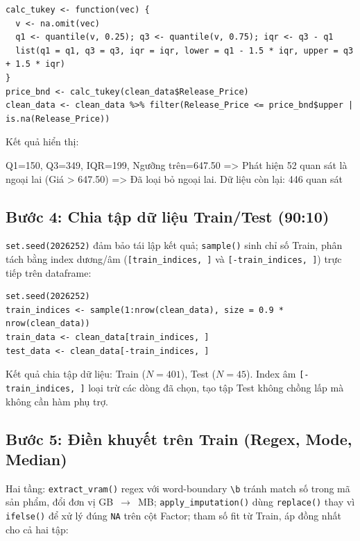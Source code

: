 \begin{verbatim}
calc_tukey <- function(vec) {
  v <- na.omit(vec)
  q1 <- quantile(v, 0.25); q3 <- quantile(v, 0.75); iqr <- q3 - q1
  list(q1 = q1, q3 = q3, iqr = iqr, lower = q1 - 1.5 * iqr, upper = q3 + 1.5 * iqr)
}
price_bnd <- calc_tukey(clean_data$Release_Price)
clean_data <- clean_data %>% filter(Release_Price <= price_bnd$upper | is.na(Release_Price))
\end{verbatim}
Kết quả hiển thị:
\begin{rconsole}
Q1=150, Q3=349, IQR=199, Ngưỡng trên=647.50
=> Phát hiện 52 quan sát là ngoại lai (Giá > 647.50)
=> Đã loại bỏ ngoại lai. Dữ liệu còn lại: 446 quan sát
\end{rconsole}

\subsection{Bước 4: Chia tập dữ liệu Train/Test (90:10)}
\label{sec:buoc_4}
\texttt{set.seed(2026252)} đảm bảo tái lập kết quả; \texttt{sample()} sinh chỉ số Train, phân tách bằng index dương/âm (\texttt{[train\_indices, ]} và \texttt{[-train\_indices, ]}) trực tiếp trên dataframe:
\begin{verbatim}
set.seed(2026252)
train_indices <- sample(1:nrow(clean_data), size = 0.9 * nrow(clean_data))
train_data <- clean_data[train_indices, ]
test_data <- clean_data[-train_indices, ]
\end{verbatim}
Kết quả chia tập dữ liệu: Train ($N = 401$), Test ($N = 45$). Index âm \texttt{[-train\_indices, ]} loại trừ các dòng đã chọn, tạo tập Test không chồng lấp mà không cần hàm phụ trợ.

\subsection{Bước 5: Điền khuyết trên Train (Regex, Mode, Median)}
\label{sec:buoc_5}
Hai tầng: \texttt{extract\_vram()} regex với word-boundary \texttt{{\textbackslash}b} tránh match số trong mã sản phẩm, đổi đơn vị GB~$\to$~MB; \texttt{apply\_imputation()} dùng \texttt{replace()} thay vì \texttt{ifelse()} để xử lý đúng \texttt{NA} trên cột Factor; tham số fit từ Train, áp đồng nhất cho cả hai tập:

